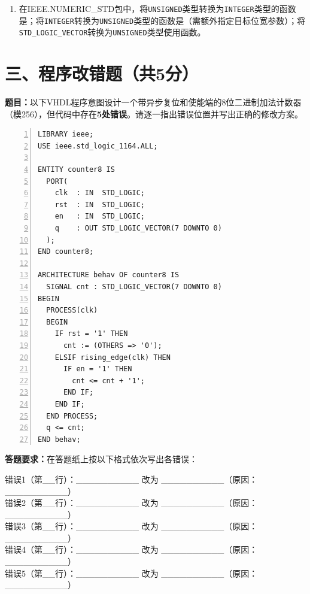 \begin{enumerate}[label=\arabic*.]
\vspace{0.5cm}

\item 在IEEE.NUMERIC\_STD包中，将\texttt{UNSIGNED}类型转换为\texttt{INTEGER}类型的函数是\underline{\hspace{2.5cm}}；将\texttt{INTEGER}转换为\texttt{UNSIGNED}类型的函数是\underline{\hspace{2.5cm}}（需额外指定目标位宽参数）；将\texttt{STD\_LOGIC\_VECTOR}转换为\texttt{UNSIGNED}类型使用\underline{\hspace{2.5cm}}函数。

\end{enumerate}

\newpage

\section*{三、程序改错题（共5分）}

\textbf{题目：}以下VHDL程序意图设计一个带异步复位和使能端的8位二进制加法计数器（模256），但代码中存在\textbf{5处错误}。请逐一指出错误位置并写出正确的修改方案。

\vspace{0.3cm}

\begin{lstlisting}[caption={带错误的8位计数器程序（找出5处错误，每处1分）}, language=VDL, numbers=left]
LIBRARY ieee;
USE ieee.std_logic_1164.ALL;

ENTITY counter8 IS
  PORT(
    clk  : IN  STD_LOGIC;
    rst  : IN  STD_LOGIC;
    en   : IN  STD_LOGIC;
    q    : OUT STD_LOGIC_VECTOR(7 DOWNTO 0)
  );
END counter8;

ARCHITECTURE behav OF counter8 IS
  SIGNAL cnt : STD_LOGIC_VECTOR(7 DOWNTO 0)
BEGIN
  PROCESS(clk)
  BEGIN
    IF rst = '1' THEN
      cnt := (OTHERS => '0');
    ELSIF rising_edge(clk) THEN
      IF en = '1' THEN
        cnt <= cnt + '1';
      END IF;
    END IF;
  END PROCESS;
  q <= cnt;
END behav;
\end{lstlisting}

\vspace{0.3cm}

\begin{framed}
\textbf{答题要求：}在答题纸上按以下格式依次写出各错误：

\noindent 错误1（第\_\_行）：\_\_\_\_\_\_\_\_\_\_ 改为 \_\_\_\_\_\_\_\_\_\_（原因：\_\_\_\_\_\_\_\_\_\_）\\
错误2（第\_\_行）：\_\_\_\_\_\_\_\_\_\_ 改为 \_\_\_\_\_\_\_\_\_\_（原因：\_\_\_\_\_\_\_\_\_\_）\\
错误3（第\_\_行）：\_\_\_\_\_\_\_\_\_\_ 改为 \_\_\_\_\_\_\_\_\_\_（原因：\_\_\_\_\_\_\_\_\_\_）\\
错误4（第\_\_行）：\_\_\_\_\_\_\_\_\_\_ 改为 \_\_\_\_\_\_\_\_\_\_（原因：\_\_\_\_\_\_\_\_\_\_）\\
错误5（第\_\_行）：\_\_\_\_\_\_\_\_\_\_ 改为 \_\_\_\_\_\_\_\_\_\_（原因：\_\_\_\_\_\_\_\_\_\_）
\end{framed}

